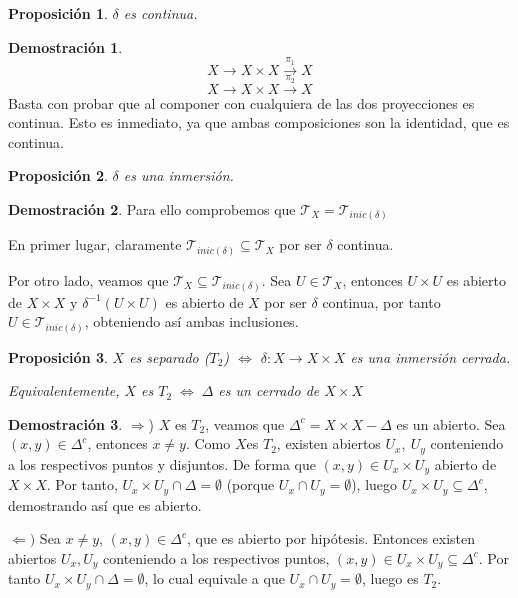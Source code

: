 \documentclass[12pt,twoside]{report}
\newcommand\mc[1]{\mathcal{#1}}
\theoremstyle{azul}
\theoremstyle{azul2}
\theoremstyle{plain}
\newtheorem*{prop}{Proposición}
\theoremstyle{definition}
\newtheorem*{dem}{Demostración}
\theoremstyle{remark}
\begin{document}
\begin{prop}
$\delta$ es continua.
\end{prop}
\begin{dem}
$$X \longrightarrow X \times X \stackrel{\pi_1}{\longrightarrow} X$$
$$X \longrightarrow X \times X \stackrel{\pi_2}{\longrightarrow} X$$
Basta con probar que al componer con cualquiera de las dos proyecciones es continua. Esto es inmediato, ya que ambas composiciones son la identidad, que es continua.
\end{dem}
\begin{prop}
$\delta$ es una inmersión.
\end{prop}
\begin{dem}
Para ello comprobemos que $\mc{T}_X=\mc{T}_{inic(\delta)}$

En primer lugar, claramente $\mc{T}_{inic(\delta)} \subseteq \mc{T}_X$ por ser $ \delta$ continua. 

Por otro lado, veamos que $\mc{T}_X\subseteq \mc{T}_{inic(\delta)}$. Sea $U \in \mc{T}_X$, entonces $U \times U$ es abierto de $X \times X$ y $\delta^{-1}(U \times U)$ es abierto de $X$ por ser $\delta$ continua, por tanto $U \in \mc{T}_{inic(\delta)}$, obteniendo así ambas inclusiones.
\end{dem}

\begin{prop}
$X$ es separado ($T_2$) $\Leftrightarrow$ $\delta: X \longrightarrow X \times X$ es una inmersión cerrada.

Equivalentemente, $X$ es $T_2 \; \iff \; \Delta$ es un cerrado de $X \times X$
\end{prop}
\begin{dem} \: 

$\Rightarrow$) $X$ es $T_2$, veamos que $\Delta^c = X \times X- \Delta$ es un abierto. Sea $(x,y) \in \Delta^c $, entonces $x \neq y$. Como $X$es $T_2$, existen abiertos $U_x, \: U_y$ conteniendo a los respectivos puntos y disjuntos. De forma que $(x,y) \in U_x \times U_y$ abierto de $X \times X$. Por tanto, $U_x \times U_y \cap \Delta = \emptyset$ (porque $U_x \cap U_y = \emptyset$), luego $U_x \times U_y \subseteq \Delta^c$, demostrando así que es abierto.

$\Leftarrow)$ Sea $x \neq y$, $(x,y) \in \Delta^c$, que es abierto por hipótesis. Entonces existen abiertos $U_x, U_y$ conteniendo a los respectivos puntos, $(x,y) \in U_x \times U_y \subseteq \Delta^c$. Por tanto $U_x \times U_y \cap \Delta = \emptyset$, lo cual equivale a que $U_x \cap U_y = \emptyset$, luego es $T_2$.  
\end{dem}
\end{document}
